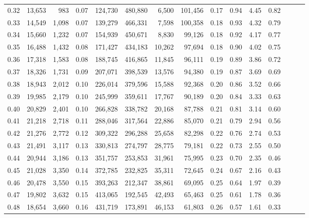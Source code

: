 \begin{tabular}{rrrrrrrrrrrrrrr}
0.32 &  13,653 &    983 &  0.07 &  124,730 &  480,880 &    6,500 &  101,456 &  0.17 &  0.94 &  4.45 &      0.82 \\
0.33 &  14,549 &  1,098 &  0.07 &  139,279 &  466,331 &    7,598 &  100,358 &  0.18 &  0.93 &  4.32 &      0.79 \\
0.34 &  15,660 &  1,232 &  0.07 &  154,939 &  450,671 &    8,830 &   99,126 &  0.18 &  0.92 &  4.17 &      0.77 \\
0.35 &  16,488 &  1,432 &  0.08 &  171,427 &  434,183 &   10,262 &   97,694 &  0.18 &  0.90 &  4.02 &      0.75 \\
0.36 &  17,318 &  1,583 &  0.08 &  188,745 &  416,865 &   11,845 &   96,111 &  0.19 &  0.89 &  3.86 &      0.72 \\
0.37 &  18,326 &  1,731 &  0.09 &  207,071 &  398,539 &   13,576 &   94,380 &  0.19 &  0.87 &  3.69 &      0.69 \\
0.38 &  18,943 &  2,012 &  0.10 &  226,014 &  379,596 &   15,588 &   92,368 &  0.20 &  0.86 &  3.52 &      0.66 \\
0.39 &  19,985 &  2,179 &  0.10 &  245,999 &  359,611 &   17,767 &   90,189 &  0.20 &  0.84 &  3.33 &      0.63 \\
0.40 &  20,829 &  2,401 &  0.10 &  266,828 &  338,782 &   20,168 &   87,788 &  0.21 &  0.81 &  3.14 &      0.60 \\
0.41 &  21,218 &  2,718 &  0.11 &  288,046 &  317,564 &   22,886 &   85,070 &  0.21 &  0.79 &  2.94 &      0.56 \\
0.42 &  21,276 &  2,772 &  0.12 &  309,322 &  296,288 &   25,658 &   82,298 &  0.22 &  0.76 &  2.74 &      0.53 \\
0.43 &  21,491 &  3,117 &  0.13 &  330,813 &  274,797 &   28,775 &   79,181 &  0.22 &  0.73 &  2.55 &      0.50 \\
0.44 &  20,944 &  3,186 &  0.13 &  351,757 &  253,853 &   31,961 &   75,995 &  0.23 &  0.70 &  2.35 &      0.46 \\
0.45 &  21,028 &  3,350 &  0.14 &  372,785 &  232,825 &   35,311 &   72,645 &  0.24 &  0.67 &  2.16 &      0.43 \\
0.46 &  20,478 &  3,550 &  0.15 &  393,263 &  212,347 &   38,861 &   69,095 &  0.25 &  0.64 &  1.97 &      0.39 \\
0.47 &  19,802 &  3,632 &  0.15 &  413,065 &  192,545 &   42,493 &   65,463 &  0.25 &  0.61 &  1.78 &      0.36 \\
0.48 &  18,654 &  3,660 &  0.16 &  431,719 &  173,891 &   46,153 &   61,803 &  0.26 &  0.57 &  1.61 &      0.33 \\

\end{tabular}
